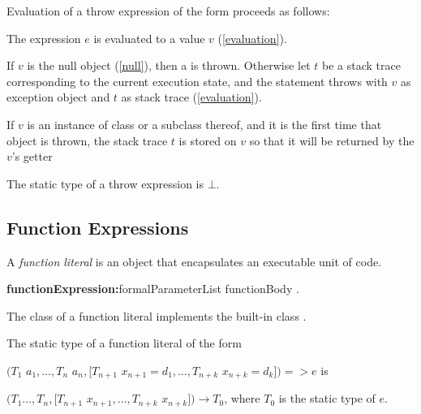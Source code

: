 \documentclass{article}
\begin{document}
\LMHash{}
Evaluation of a throw expression of the form  proceeds as follows:

\LMHash{}
The expression $e$ is evaluated to a value $v$ (\ref{evaluation}).


\LMHash{}
If $v$ is the null object (\ref{null}), then a  is thrown.
Otherwise let $t$ be a stack trace corresponding to the current execution state,
and the \THROW{} statement throws with $v$ as exception object
and $t$ as stack trace (\ref{evaluation}).

\LMHash{}
If $v$ is an instance of class  or a subclass thereof,
and it is the first time that  object is thrown,
the stack trace $t$ is stored on $v$ so that it will be returned
by the $v$'s  getter


\LMHash{}
The static type of a throw expression is $\bot$.


\subsection{Function Expressions}

\LMHash{}
A {\em function literal} is an object that encapsulates an executable unit of code.

\begin{grammar}
{\bf functionExpression:}formalParameterList functionBody
  .
\end{grammar}

\LMHash{}
The class of a function literal implements the built-in class .


\LMHash{}
The static type of a function literal of the form

$(T_1$ $a_1, \ldots, T_n$ $a_n, [T_{n+1}$ $x_{n+1} = d_1, \ldots, T_{n+k}$ $x_{n+k} = d_k]) => e$
is

$(T_1 \ldots, T_n, [T_{n+1}$ $x_{n+1}, \ldots, T_{n+k}$ $x_{n+k}]) \rightarrow T_0$, where $T_0$ is the static type of $e$.
\end{document}
